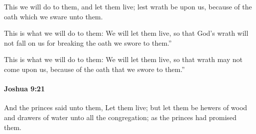 			\begin{versebox}
					\item[BHS] 
					\item[ASV] This we will do to them, and let them live; lest wrath be upon us, because of the oath which we sware unto them.
					\item[NIV] This is what we will do to them: We will let them live, so that God’s wrath will not fall on us for breaking the oath we swore to them.”
					\item[NRSV] This is what we will do to them: We will let them live, so that wrath may not come upon us, because of the oath that we swore to them.”
			\end{versebox}

		\paragraph{Joshua 9:21} %
			\label{JOSHUA-9-21}

			And the princes said unto them, Let them live; but let them be hewers of wood and drawers of water unto all the congregation; as the princes had promised them.

